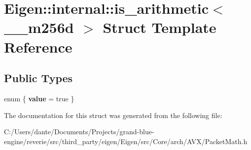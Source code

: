\hypertarget{struct_eigen_1_1internal_1_1is__arithmetic_3_01____m256d_01_4}{}\section{Eigen\+::internal\+::is\+\_\+arithmetic$<$ \+\_\+\+\_\+m256d $>$ Struct Template Reference}
\label{struct_eigen_1_1internal_1_1is__arithmetic_3_01____m256d_01_4}
\subsection*{Public Types}
\begin{DoxyCompactItemize}
\item 
\mbox{\label{struct_eigen_1_1internal_1_1is__arithmetic_3_01____m256d_01_4_a81c875dfc3de481e8cd6312ef4e9a1a1}} 
enum \{ {\bfseries value} = true
 \}
\end{DoxyCompactItemize}


The documentation for this struct was generated from the following file\+:\begin{DoxyCompactItemize}
\item 
C\+:/\+Users/dante/\+Documents/\+Projects/grand-\/blue-\/engine/reverie/src/third\+\_\+party/eigen/\+Eigen/src/\+Core/arch/\+A\+V\+X/Packet\+Math.\+h\end{DoxyCompactItemize}
